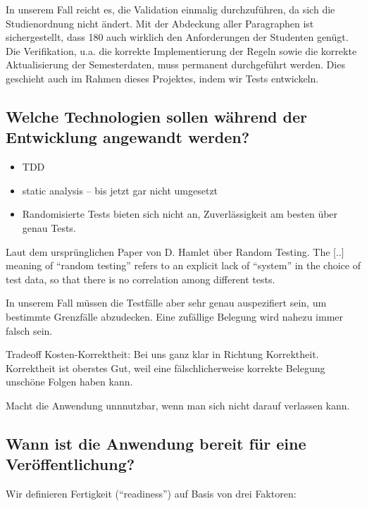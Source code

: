 \documentclass[ngerman]{article}
\begin{document}
In unserem Fall reicht es, die Validation einmalig durchzuführen, da sich die Studienordnung nicht ändert.
Mit der Abdeckung aller Paragraphen ist sichergestellt, dass 180 auch wirklich den Anforderungen der Studenten genügt.
Die Verifikation, u.a. die korrekte Implementierung der Regeln sowie die korrekte Aktualisierung der Semesterdaten, muss permanent durchgeführt werden.
Dies geschieht auch im Rahmen dieses Projektes, indem wir Tests entwickeln.

\subsection{Welche Technologien sollen während der Entwicklung angewandt werden?}

\begin{itemize}
    \item
        TDD
    \item
        static analysis -- bis jetzt gar nicht umgesetzt
    \item
        Randomisierte Tests bieten sich nicht an, Zuverlässigkeit am besten über genau Tests.
\end{itemize}

Laut dem ursprünglichen Paper von D. Hamlet über Random Testing.
The [..] meaning of ``random testing'' refers to an
explicit lack of ``system'' in the choice of test data, so that there is
no correlation among different tests.

In unserem Fall müssen die Testfälle aber sehr genau auspezifiert sein, um bestimmte Grenzfälle abzudecken. Eine zufällige Belegung wird nahezu immer falsch sein.

Tradeoff Kosten-Korrektheit: Bei uns ganz klar in Richtung Korrektheit.
Korrektheit ist oberstes Gut, weil eine fälschlicherweise korrekte Belegung unschöne Folgen haben kann.

Macht die Anwendung unnnutzbar, wenn man sich nicht darauf verlassen kann.

\subsection{Wann ist die Anwendung bereit für eine Veröffentlichung?}

Wir definieren Fertigkeit (``readiness'') auf Basis von drei Faktoren:
\end{document}
